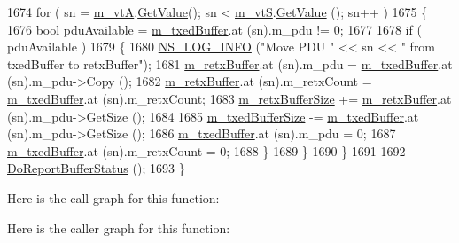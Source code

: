 \begin{DoxyCode}
1674       \textcolor{keywordflow}{for} ( sn = \hyperlink{classns3_1_1LteRlcAm_a55514b9f03d8f70cdbb8cdac053f39b5}{m\_vtA}.\hyperlink{classns3_1_1SequenceNumber10_a9dcaea04bc415e169e7e0020ce579d01}{GetValue}(); sn < \hyperlink{classns3_1_1LteRlcAm_a4efc8184c7973cb7b7c896ed514a7b06}{m\_vtS}.\hyperlink{classns3_1_1SequenceNumber10_a9dcaea04bc415e169e7e0020ce579d01}{GetValue} (); sn++ )
1675         \{
1676           \textcolor{keywordtype}{bool} pduAvailable = \hyperlink{classns3_1_1LteRlcAm_afabb45c6de7da492347b45c139de0c28}{m\_txedBuffer}.at (sn).m\_pdu != 0;
1677 
1678            \textcolor{keywordflow}{if} ( pduAvailable )
1679              \{
1680                \hyperlink{group__logging_gafbd73ee2cf9f26b319f49086d8e860fb}{NS\_LOG\_INFO} (\textcolor{stringliteral}{"Move PDU "} << sn << \textcolor{stringliteral}{" from txedBuffer to retxBuffer"});
1681                \hyperlink{classns3_1_1LteRlcAm_ab34bb5fce080a41395ad7ea5789af8d0}{m\_retxBuffer}.at (sn).m\_pdu = \hyperlink{classns3_1_1LteRlcAm_afabb45c6de7da492347b45c139de0c28}{m\_txedBuffer}.at (sn).m\_pdu->Copy ();
1682                \hyperlink{classns3_1_1LteRlcAm_ab34bb5fce080a41395ad7ea5789af8d0}{m\_retxBuffer}.at (sn).m\_retxCount = \hyperlink{classns3_1_1LteRlcAm_afabb45c6de7da492347b45c139de0c28}{m\_txedBuffer}.at (sn).m\_retxCount;
1683                \hyperlink{classns3_1_1LteRlcAm_af270916ffd1805b027a7b9cc05c91e7d}{m\_retxBufferSize} += \hyperlink{classns3_1_1LteRlcAm_ab34bb5fce080a41395ad7ea5789af8d0}{m\_retxBuffer}.at (sn).m\_pdu->GetSize ();
1684 
1685                \hyperlink{classns3_1_1LteRlcAm_add3fe05a0fd3a4ad1fcb7db0239c698f}{m\_txedBufferSize} -= \hyperlink{classns3_1_1LteRlcAm_afabb45c6de7da492347b45c139de0c28}{m\_txedBuffer}.at (sn).m\_pdu->GetSize ();
1686                \hyperlink{classns3_1_1LteRlcAm_afabb45c6de7da492347b45c139de0c28}{m\_txedBuffer}.at (sn).m\_pdu = 0;
1687                \hyperlink{classns3_1_1LteRlcAm_afabb45c6de7da492347b45c139de0c28}{m\_txedBuffer}.at (sn).m\_retxCount = 0;
1688              \}
1689         \}
1690     \}
1691 
1692   \hyperlink{classns3_1_1LteRlcAm_ad81917dde659b1c241aa8d22013c8f4b}{DoReportBufferStatus} ();  
1693 \}
\end{DoxyCode}


Here is the call graph for this function\+:




Here is the caller graph for this function\+:



